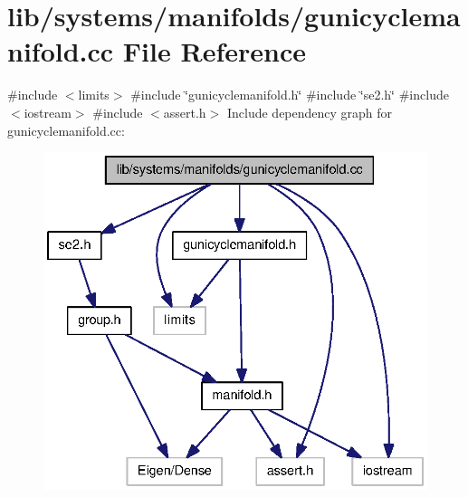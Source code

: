 \section{lib/systems/manifolds/gunicyclemanifold.cc \-File \-Reference}
\label{gunicyclemanifold_8cc}
{\ttfamily \#include $<$limits$>$}\*
{\ttfamily \#include \char`\"{}gunicyclemanifold.\-h\char`\"{}}\*
{\ttfamily \#include \char`\"{}se2.\-h\char`\"{}}\*
{\ttfamily \#include $<$iostream$>$}\*
{\ttfamily \#include $<$assert.\-h$>$}\*
\-Include dependency graph for gunicyclemanifold.\-cc\-:
\nopagebreak
\begin{figure}[H]
\begin{center}
\leavevmode
\includegraphics[width=332pt]{gunicyclemanifold_8cc__incl}
\end{center}
\end{figure}
